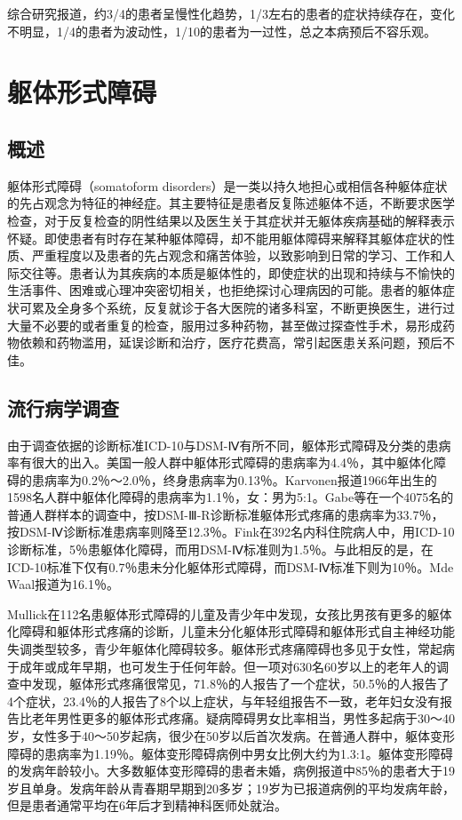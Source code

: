 综合研究报道，约3/4的患者呈慢性化趋势，1/3左右的患者的症状持续存在，变化不明显，1/4的患者为波动性，1/10的患者为一过性，总之本病预后不容乐观。

\section{躯体形式障碍}

\subsection{概述}

躯体形式障碍（somatoform
disorders）是一类以持久地担心或相信各种躯体症状的先占观念为特征的神经症。其主要特征是患者反复陈述躯体不适，不断要求医学检查，对于反复检查的阴性结果以及医生关于其症状并无躯体疾病基础的解释表示怀疑。即使患者有时存在某种躯体障碍，却不能用躯体障碍来解释其躯体症状的性质、严重程度以及患者的先占观念和痛苦体验，以致影响到日常的学习、工作和人际交往等。患者认为其疾病的本质是躯体性的，即使症状的出现和持续与不愉快的生活事件、困难或心理冲突密切相关，也拒绝探讨心理病因的可能。患者的躯体症状可累及全身多个系统，反复就诊于各大医院的诸多科室，不断更换医生，进行过大量不必要的或者重复的检查，服用过多种药物，甚至做过探查性手术，易形成药物依赖和药物滥用，延误诊断和治疗，医疗花费高，常引起医患关系问题，预后不佳。

\subsection{流行病学调查}

由于调查依据的诊断标准ICD-10与DSM-Ⅳ有所不同，躯体形式障碍及分类的患病率有很大的出入。美国一般人群中躯体形式障碍的患病率为4.4％，其中躯体化障碍的患病率为0.2％～2.0％，终身患病率为0.13％。Karvonen报道1966年出生的1598名人群中躯体化障碍的患病率为1.1％，女：男为5:1。Gabe等在一个4075名的普通人群样本的调查中，按DSM-Ⅲ-R诊断标准躯体形式疼痛的患病率为33.7％，按DSM-Ⅳ诊断标准患病率则降至12.3％。Fink在392名内科住院病人中，用ICD-10诊断标准，5％患躯体化障碍，而用DSM-Ⅳ标准则为1.5％。与此相反的是，在ICD-10标准下仅有0.7％患未分化躯体形式障碍，而DSM-Ⅳ标准下则为10％。Mde
Waal报道为16.1％。

Mullick在112名患躯体形式障碍的儿童及青少年中发现，女孩比男孩有更多的躯体化障碍和躯体形式疼痛的诊断，儿童未分化躯体形式障碍和躯体形式自主神经功能失调类型较多，青少年躯体化障碍较多。躯体形式疼痛障碍也多见于女性，常起病于成年或成年早期，也可发生于任何年龄。但一项对630名60岁以上的老年人的调查中发现，躯体形式疼痛很常见，71.8％的人报告了一个症状，50.5％的人报告了4个症状，23.4％的人报告了8个以上症状，与年轻组报告不一致，老年妇女没有报告比老年男性更多的躯体形式疼痛。疑病障碍男女比率相当，男性多起病于30～40岁，女性多于40～50岁起病，很少在50岁以后首次发病。在普通人群中，躯体变形障碍的患病率为1.19％。躯体变形障碍病例中男女比例大约为1.3:1。躯体变形障碍的发病年龄较小。大多数躯体变形障碍的患者未婚，病例报道中85％的患者大于19岁且单身。发病年龄从青春期早期到20多岁；19岁为已报道病例的平均发病年龄，但是患者通常平均在6年后才到精神科医师处就治。

